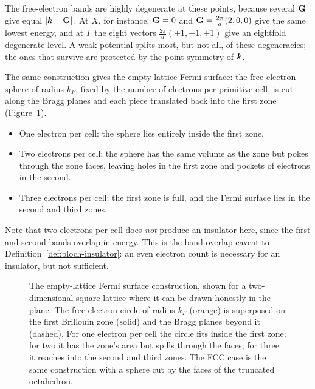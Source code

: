 The free-electron bands are highly degenerate at these points, because several $\cvect{G}$ give equal $|\lvect{k}-\cvect{G}|$. At $X$, for instance, $\cvect{G}=0$ and $\cvect{G}=\frac{2\pi}{a}(2,0,0)$ give the same lowest energy, and at $\Gamma$ the eight vectors $\frac{2\pi}{a}(\pm1,\pm1,\pm1)$ give an eightfold degenerate level. A weak potential splits most, but not all, of these degeneracies; the ones that survive are protected by the point symmetry of $\bm{k}$.

The same construction gives the empty-lattice Fermi surface: the free-electron sphere of radius $k_F$, fixed by the number of electrons per primitive cell, is cut along the Bragg planes and each piece translated back into the first zone (Figure~\ref{fig:bloch-empty-fs}).
\begin{itemize}
    \item One electron per cell: the sphere lies entirely inside the first zone.
    \item Two electrons per cell: the sphere has the same volume as the zone but pokes through the zone faces, leaving holes in the first zone and pockets of electrons in the second.
    \item Three electrons per cell: the first zone is full, and the Fermi surface lies in the second and third zones.
\end{itemize}
Note that two electrons per cell does \emph{not} produce an insulator here, since the first and second bands overlap in energy. This is the band-overlap caveat to Definition~\ref{def:bloch-insulator}: an even electron count is necessary for an insulator, but not sufficient.

\begin{figure}[ht]
\centering
{}
\caption{The empty-lattice Fermi surface construction, shown for a two-dimensional square lattice where it can be drawn honestly in the plane. The free-electron circle of radius $k_F$ (orange) is superposed on the first Brillouin zone (solid) and the Bragg planes beyond it (dashed). For one electron per cell the circle fits inside the first zone; for two it has the zone's area but spills through the faces; for three it reaches into the second and third zones. The FCC case is the same construction with a sphere cut by the faces of the truncated octahedron.}
\label{fig:bloch-empty-fs}
\end{figure}

